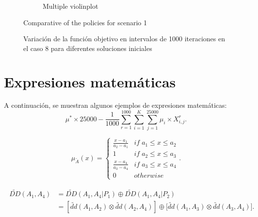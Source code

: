 \begin{figure}[!htb]
\begin{subfigure}[b]{0.5\textwidth}
        \caption{Multiple violinplot}
        \label{fig:Bernoulli1_boxplot}
    \end{subfigure}
    \caption{Comparative of the policies for scenario 1}
    \label{fig:Bernoulli1}
\end{figure}

\begin{figure}[!ht]
	\centering
	
	\caption{Variación de la función objetivo en intervalos de 1000 iteraciones en el caso 8 para diferentes soluciones iniciales}
	\label{fig:variacion_fitness}
\end{figure}

\section{Expresiones matemáticas}
A continuación, se muestran algunos ejemplos de expresiones matemáticas:
\begin{equation}
\mu^*\times 25000-\frac{1}{1000}\sum_{r=1}^{1000}\sum_{i=1}^{K}\sum_{j=1}^{25000}\mu_i\times X_{i,j}^r.
\end{equation}

\begin{equation}
\mu_{\widetilde{A}}(x)=\left\{ \begin{array}{cc}
\frac{x-a_{1}}{a_{2}-a_{1}} & if\; a_{1}\leq x\leq a_{2}\\
1 & if\; a_{2}\leq x\leq a_{3}\\
\frac{x-a_{4}}{a_{3}-a_{4}} & if\; a_{3}\leq x\leq a_{4}\\
0 & otherwise
\end{array}\right. .
\end{equation}

\begin{align}
\begin{split}
\widetilde{DD}(A_{1},A_{4}) & =\widetilde{DD}(A_{1},A_{4}|P_{1})\oplus \widetilde{DD}(A_{1},A_{4}|P_{2}) \\
& =[\widetilde{dd}(A_{1},A_{2})\otimes \widetilde{dd}(A_{2},A_{4})]\oplus \lbrack \widetilde{dd}(A_{1},A_{3})\otimes \widetilde{dd}(A_{3},A_{4})].
\end{split}
\end{align}

